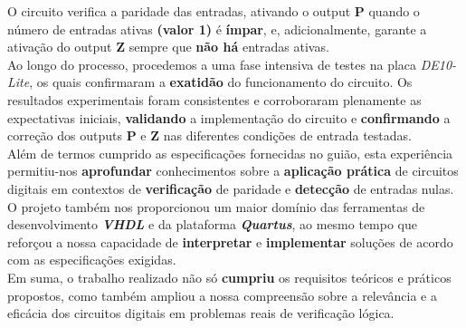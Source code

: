 \documentclass[12pt]{article}
\begin{document}
O circuito verifica a paridade das entradas, ativando o output \textbf{P} quando o número de entradas ativas \textbf{(valor 1)} é \textbf{ímpar}, e, adicionalmente, garante a ativação do output \textbf{Z} sempre que \textbf{não há} entradas ativas.\\

Ao longo do processo, procedemos a uma fase intensiva de testes na placa \textit{DE10-Lite}, os quais confirmaram a \textbf{exatidão} do funcionamento do circuito. Os resultados experimentais foram consistentes e corroboraram plenamente as expectativas iniciais, \textbf{validando} a implementação do circuito e \textbf{confirmando} a correção dos outputs \textbf{P} e \textbf{Z} nas diferentes condições de entrada testadas.\\

Além de termos cumprido as especificações fornecidas no guião, esta experiência permitiu-nos \textbf{aprofundar} conhecimentos sobre a \textbf{aplicação prática} de circuitos digitais em contextos de \textbf{verificação} de paridade e \textbf{detecção} de entradas nulas. O projeto também nos proporcionou um maior domínio das ferramentas de desenvolvimento \textit{\textbf{VHDL}} e da plataforma \textit{\textbf{Quartus}}, ao mesmo tempo que reforçou a nossa capacidade de \textbf{interpretar} e \textbf{implementar} soluções de acordo com as especificações exigidas.\\

Em suma, o trabalho realizado não só \textbf{cumpriu} os requisitos teóricos e práticos propostos, como também ampliou a nossa compreensão sobre a relevância e a eficácia dos circuitos digitais em problemas reais de verificação lógica.
 


\end{document}
